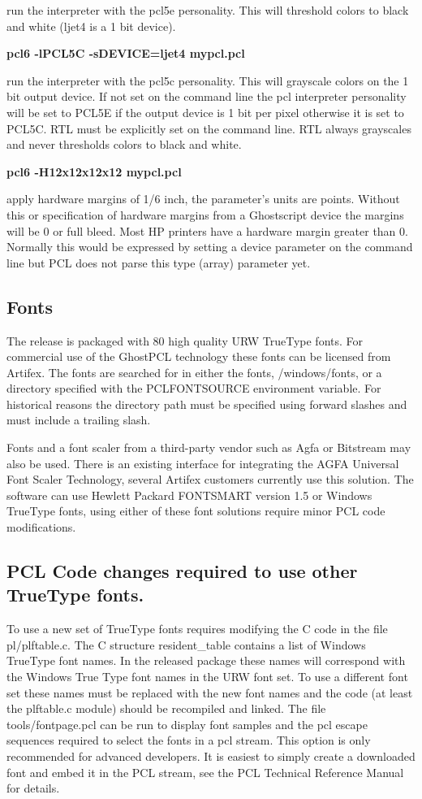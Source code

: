\documentclass[10pt]{article}
\begin{document}
run the interpreter with the pcl5e personality. This will threshold
colors to black and white (ljet4 is a 1 bit device).

\textbf{pcl6 -lPCL5C -sDEVICE=ljet4 mypcl.pcl}

run the interpreter with the pcl5c personality. This will grayscale
colors on the 1 bit output device.  If not set on the command line the
pcl interpreter personality will be set to PCL5E if the output device
is 1 bit per pixel otherwise it is set to PCL5C. RTL must be
explicitly set on the command line. RTL always grayscales and never
thresholds colors to black and white.

\textbf{pcl6 -H12x12x12x12 mypcl.pcl}

apply hardware margins of 1/6 inch, the parameter's units are points.
Without this or specification of hardware margins from a Ghostscript
device the margins will be 0 or full bleed.  Most HP printers have a
hardware margin greater than 0.  Normally this would be expressed by
setting a device parameter on the command line but PCL does not parse
this type (array) parameter yet.

\subsection*{Fonts}

The release is packaged with 80 high quality URW TrueType fonts. For
commercial use of the GhostPCL technology these fonts can be licensed
from Artifex. The fonts are searched for in either the fonts,
/windows/fonts, or a directory specified with the PCLFONTSOURCE
environment variable.  For historical reasons the directory path must
be specified using forward slashes and must include a trailing slash.

Fonts and a font scaler from a third-party vendor such as Agfa or
Bitstream may also be used. There is an existing interface for
integrating the AGFA Universal Font Scaler Technology, several Artifex
customers currently use this solution. The software can use Hewlett
Packard FONTSMART version 1.5 or Windows TrueType fonts, using either
of these font solutions require minor PCL code modifications.

\subsection*{PCL Code changes required to use other TrueType fonts.}

To use a new set of TrueType fonts requires modifying the C code in
the file pl/plftable.c. The C structure resident\_table contains a
list of Windows TrueType font names. In the released package these
names will correspond with the Windows True Type font names in the URW
font set. To use a different font set these names must be replaced
with the new font names and the code (at least the plftable.c module)
should be recompiled and linked.  The file tools/fontpage.pcl can be
run to display font samples and the pcl escape sequences required to
select the fonts in a pcl stream.  This option is only recommended for
advanced developers.  It is easiest to simply create a downloaded font
and embed it in the PCL stream, see the PCL Technical Reference
Manual~\cite{PCLTRM} for details.
\end{document}
